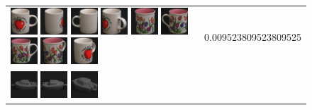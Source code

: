 \begin{figure}[tbp]
\begin{center}
\begin{tabular}{m{11cm} | m{3cm} |}
\includegraphics[width=1cm]{coil/beeld-36.eps}
\includegraphics[width=1cm]{coil/beeld-38.eps}
\includegraphics[width=1cm]{coil/beeld-37.eps}
\includegraphics[width=1cm]{coil/beeld-40.eps}
\includegraphics[width=1cm]{coil/beeld-8.eps}
\includegraphics[width=1cm]{coil/beeld-7.eps}
\includegraphics[width=1cm]{coil/beeld-6.eps}
\includegraphics[width=1cm]{coil/beeld-9.eps}
\includegraphics[width=1cm]{coil/beeld-39.eps}
& {\scriptsize 0.009523809523809525}
\\
\includegraphics[width=1cm]{coil/beeld-24.eps}
\includegraphics[width=1cm]{coil/beeld-27.eps}
\includegraphics[width=1cm]{coil/beeld-25.eps}

\end{tabular}
\end{center}
\end{figure}
